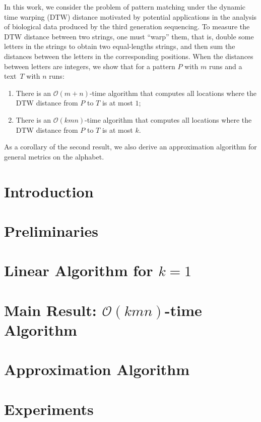 
\providecommand{\norm}[1]{\ensuremath{\lVert#1\rVert}}
\providecommand{\ceil}[1]{\ensuremath{\lceil#1\rceil}}
\newcommand{\dtw}{\mathrm{DTW}}
\newcommand{\ham}{\mathrm{HAM}}
\providecommand{\dd}{\mathinner{.\,.\allowbreak}}
\providecommand{\Oh}{\mathcal{O}}
\providecommand{\eps}{\varepsilon}
\newcommand{\invacker}{\alpha}

\newcommand{\inputDTW}[1]{}
\newcommand{\figDTW}[2]{\texttt{[image: Part\_Two/dtw/\#2]}}

\begin{small}
In this work, we consider the problem of pattern matching under the dynamic time warping ($\dtw$) distance motivated by potential applications in the analysis of biological data produced by the third generation sequencing. To measure the $\dtw$ distance between two strings, one must ``warp'' them, that is, double some letters in the strings to obtain two equal-lengths strings, and then sum the distances between the letters in the corresponding positions. When the distances between letters are integers, we show that for a pattern $P$ with $m$ runs and a text~$T$ with $n$ runs:
\begin{enumerate}
\item There is an $\Oh(m+n)$-time algorithm that computes all locations where the $\dtw$ distance from $P$ to $T$ is at most $1$;
\item There is an $\Oh(kmn)$-time algorithm that computes all locations where the $\dtw$ distance from $P$ to $T$ is at most $k$.
\end{enumerate}
As a corollary of the second result, we also derive an approximation algorithm for general metrics on the alphabet. 
\end{small}

\section{Introduction}
\inputDTW{intro}

\section{Preliminaries}\label{dtw:sec:prelim}
\inputDTW{prelim}

\section{Linear Algorithm for \texorpdfstring{$k=1$}{kone}}
\label{dtw:sec:lce}
\inputDTW{lce}

\section{Main Result: \texorpdfstring{$\Oh(kmn)$}{Okm}-time Algorithm}
\label{dtw:sec:block}
\inputDTW{block_new}

\section{Approximation Algorithm}
\label{dtw:sec:approx}
\inputDTW{approx}

\section{Experiments}\label{dtw:sec:experiments}
\inputDTW{experiments}
